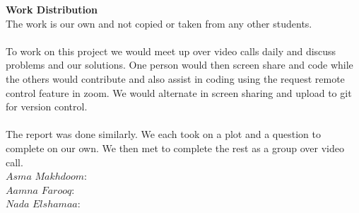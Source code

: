 \documentclass{article}
\theoremstyle{definition}
\begin{document}
\textbf{Work Distribution}
\\
The work is our own and not copied or taken from any other students. 
\\\\
To work on this project we would meet up over video calls daily and discuss problems and our solutions. One person would then screen share and code while the others would contribute and also assist in coding using the request remote control feature in zoom. We would alternate in screen sharing and upload to git for version control. 
\\\\
The report was done similarly. We each took on a plot and a question to complete on our own. We then met to complete the rest as a group over video call. 
\\
$Asma$ $Makhdoom:$ 
\\
$Aamna$ $Farooq:$ 
\\
$Nada$ $Elshamaa:$ 
\\
\smallskip
\end{document}
